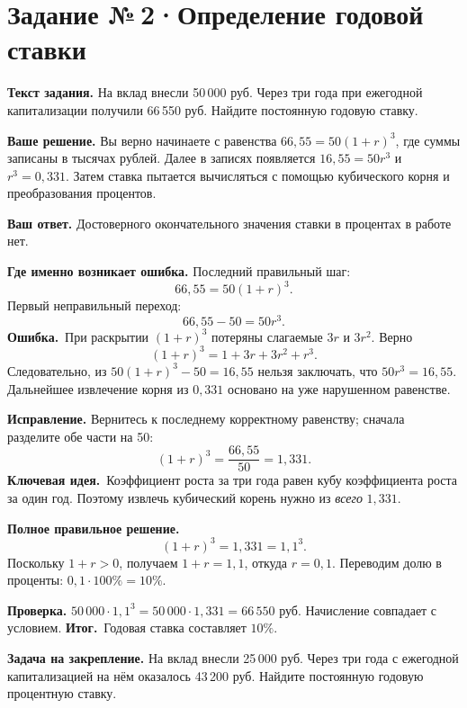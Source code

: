 \documentclass[a4paper,11pt]{article}
\newcommand{\err}{\textcolor{red!75!black}{\textbf{Ошибка.}}\ }
\newcommand{\idea}{\textcolor{accent}{\textbf{Ключевая идея.}}\ }
\newcommand{\result}{\textcolor{accent}{\textbf{Итог.}}\ }
\newcommand{\task}[2]{\clearpage\phantomsection\label{task:#1}\section*{Задание №\,#1\;·\;#2}}
\newcommand{\labelp}[1]{\par\smallskip\textbf{#1.}\enspace}
\begin{document}
\task{2}{Определение годовой ставки}
\labelp{Текст задания} На вклад внесли 50\,000 руб. Через три года при ежегодной капитализации получили 66\,550 руб. Найдите постоянную годовую ставку.
\labelp{Ваше решение} Вы верно начинаете с равенства $66{,}55=50(1+r)^3$, где суммы записаны в тысячах рублей. Далее в записях появляется $16{,}55=50r^3$ и $r^3=0{,}331$. Затем ставка пытается вычисляться с помощью кубического корня и преобразования процентов.
\labelp{Ваш ответ} Достоверного окончательного значения ставки в процентах в работе нет.
\labelp{Где именно возникает ошибка} Последний правильный шаг:
\[66{,}55=50(1+r)^3.\]
Первый неправильный переход:
\[66{,}55-50=50r^3.\]
\err При раскрытии $(1+r)^3$ потеряны слагаемые $3r$ и $3r^2$. Верно
\[(1+r)^3=1+3r+3r^2+r^3.\]
Следовательно, из $50(1+r)^3-50=16{,}55$ нельзя заключать, что $50r^3=16{,}55$. Дальнейшее извлечение корня из $0{,}331$ основано на уже нарушенном равенстве.
\labelp{Исправление} Вернитесь к последнему корректному равенству; сначала разделите обе части на 50:
\[(1+r)^3=\frac{66{,}55}{50}=1{,}331.\]
\idea Коэффициент роста за три года равен кубу коэффициента роста за один год. Поэтому извлечь кубический корень нужно из \emph{всего} $1{,}331$.
\labelp{Полное правильное решение}
\[(1+r)^3=1{,}331=1{,}1^3.\]
Поскольку $1+r>0$, получаем $1+r=1{,}1$, откуда $r=0{,}1$. Переводим долю в проценты: $0{,}1\cdot100\%=10\%$.
\labelp{Проверка} $50\,000\cdot1{,}1^3=50\,000\cdot1{,}331=66\,550$ руб. Начисление совпадает с условием.
\result Годовая ставка составляет $10\%$.
\labelp{Задача на закрепление} На вклад внесли 25\,000 руб. Через три года с ежегодной капитализацией на нём оказалось 43\,200 руб. Найдите постоянную годовую процентную ставку.
\end{document}
